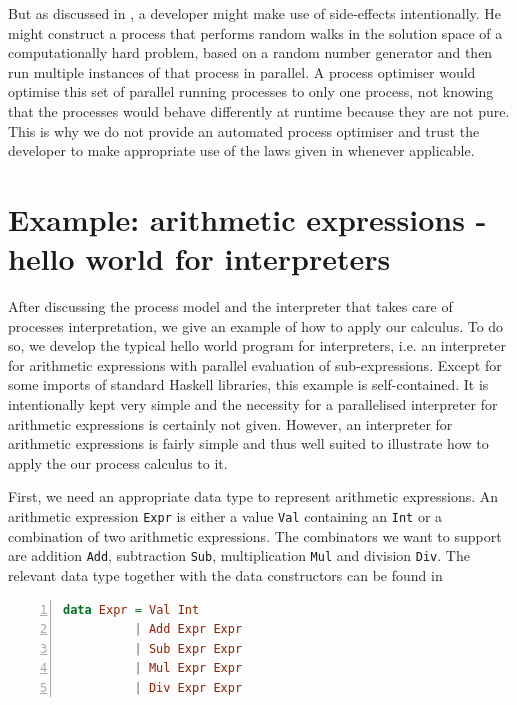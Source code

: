 But as discussed in , a developer might make use of side-effects intentionally. He might construct a process that performs random walks in the solution space of a computationally hard problem, based on a random number generator and then run multiple instances of that process in parallel. A process optimiser would optimise this set of parallel running processes to only one process, not knowing that the processes would behave differently at runtime because they are not pure. This is why we do not provide an automated process optimiser and trust the developer to make appropriate use of the laws given in  whenever applicable.

\section{Example: arithmetic expressions - hello world for interpreters}
\label{chp:example}
After discussing the process model and the interpreter that takes care of processes interpretation, we give an example of how to apply our calculus. To do so, we develop the typical hello world program for interpreters, i.e. an interpreter for arithmetic expressions with parallel evaluation of sub-expressions. Except for some imports of standard \textsf{Haskell} libraries, this example is self-contained. It is intentionally kept very simple and the necessity for a parallelised interpreter for arithmetic expressions is certainly not given. However, an interpreter for arithmetic expressions is fairly simple and thus well suited to illustrate how to apply the our process calculus to it.

First, we need an appropriate data type to represent arithmetic expressions. An arithmetic expression \texttt{Expr} is either a value \texttt{Val} containing an \texttt{Int} or a combination of two arithmetic expressions. The combinators we want to support are addition \texttt{Add}, subtraction \texttt{Sub}, multiplication \texttt{Mul} and division \texttt{Div}. The relevant data type together with the data constructors can be found in  
\begin{lstlisting}[language=Haskell, caption=Data model for the representation of arithmetic expressions., label=lst:arith_model, numbers=left, frame=bt]
data Expr = Val Int
          | Add Expr Expr
          | Sub Expr Expr
          | Mul Expr Expr
          | Div Expr Expr
\end{lstlisting}

